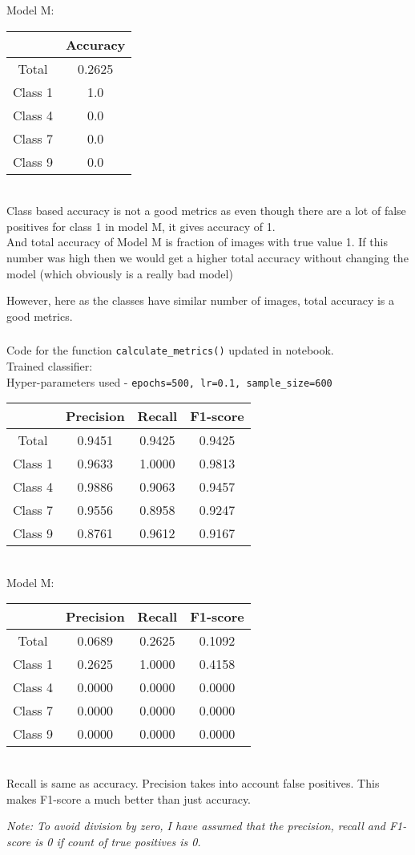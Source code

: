 \documentclass[12pt, fleqn]{article}
\begin{document}
Model M: \\
\begin{tabular}{|c||c||}
  \hline
          & Accuracy \\
  \hline
  Total   & 0.2625   \\
  Class 1 & 1.0      \\
  Class 4 & 0.0      \\
  Class 7 & 0.0      \\
  Class 9 & 0.0      \\
  \hline
\end{tabular} \\

Class based accuracy is not a good metrics as even though there are a lot of false positives for class 1 in model M, it gives accuracy of 1. \\
And total accuracy of Model M is fraction of images with true value 1. If this number was high then we would get a higher total accuracy without changing the model (which obviously is a really bad model)

However, here as the classes have similar number of images, total accuracy is a good metrics. \\

\subsubsection{}
Code for the function \verb!calculate_metrics()! updated in notebook. \\

Trained classifier: \\
Hyper-parameters used - \texttt{epochs=500, lr=0.1, sample\_size=600} \\
\begin{tabular}{|c||c|c|c||}
  \hline
          & Precision & Recall & F1-score \\
  \hline
  Total   & 0.9451    & 0.9425 & 0.9425   \\
  Class 1 & 0.9633    & 1.0000 & 0.9813   \\
  Class 4 & 0.9886    & 0.9063 & 0.9457   \\
  Class 7 & 0.9556    & 0.8958 & 0.9247   \\
  Class 9 & 0.8761    & 0.9612 & 0.9167   \\
  \hline
\end{tabular} \\

Model M: \\
\begin{tabular}{|c||c|c|c||}
  \hline
          & Precision & Recall & F1-score \\
  \hline
  Total   & 0.0689    & 0.2625 & 0.1092   \\
  Class 1 & 0.2625    & 1.0000 & 0.4158   \\
  Class 4 & 0.0000    & 0.0000 & 0.0000   \\
  Class 7 & 0.0000    & 0.0000 & 0.0000   \\
  Class 9 & 0.0000    & 0.0000 & 0.0000   \\
  \hline
\end{tabular} \\

Recall is same as accuracy. Precision takes into account false positives. This makes F1-score a much better than just accuracy.

\medskip

\textit{Note: To avoid division by zero, I have assumed that the precision, recall and F1-score is 0 if count of true positives is 0.}
\end{document}

